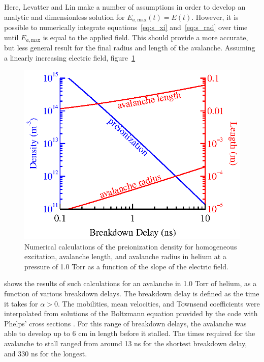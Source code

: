 {Here, Levatter and Lin make a number of assumptions in order to develop an
analytic and dimensionless solution for $E_{a,\mathrm{max}}(t) = E(t)$. However,
it is possible to numerically integrate equations~\ref{eq:s_xi}
and~\ref{eq:s_rad} over time until $E_{a,\mathrm{max}}$ is equal to the applied
field. This should provide a more accurate, but less general result for the
final radius and length of the avalanche. Assuming a linearly increasing
electric field, figure~\ref{fig:he_avalanche}
\begin{figure}
  \centering
  \includegraphics{./chapters/theory/figures/he_avalanche.eps}
  \caption{Numerical calculations of the preionization density for homogeneous
    excitation, avalanche length, and avalanche radius in helium at a pressure
    of 1.0 Torr as a function of the slope of the electric field.}
  \label{fig:he_avalanche}
\end{figure}
shows the results of such calculations for an avalanche in 1.0 Torr of helium,
as a function of various breakdown delays. The breakdown delay is defined as the
time it takes for $\alpha > 0$. The mobilities, mean velocities, and Townsend
coefficients were interpolated from solutions of the Boltzmann equation provided
by the  code with Phelps' cross sections \cite{Phelps2002}. For
this range of breakdown delays, the avalanche was able to develop up to 6 cm in
length before it stalled. The times required for the avalanche to stall ranged
from around 13 ns for the shortest breakdown delay, and 330 ns for the longest.

}

